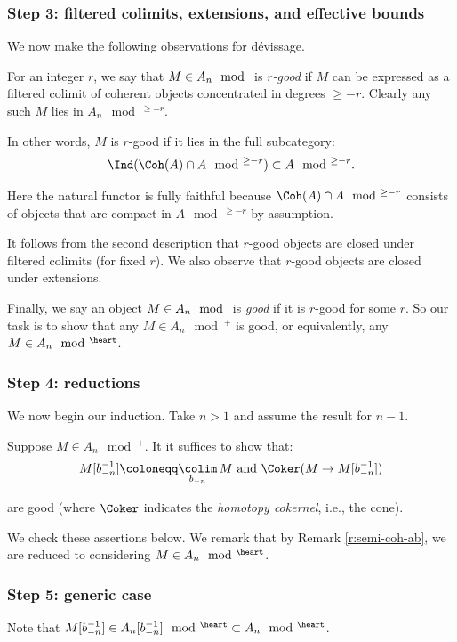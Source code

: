 \subsubsection{Step 3: filtered colimits, extensions, and effective bounds}
We now make the following observations for d\'evissage.

For an integer $r$, we say that $M \in A_n\mod$ is \emph{$r$-good} if $M$ can be
expressed as a filtered colimit of coherent objects concentrated in
degrees $\geq -r$. Clearly any such $M$ lies in $A_n\mod^{\geq -r}$.

In other words, $M$ is $r$-good if it lies in the full subcategory:
%
\[
\Ind(\Coh(A) \cap A\mod^{\geq -r}) \subset A\mod^{\geq -r}.
\]

 Here the natural functor is fully faithful because
$\Coh(A) \cap A\mod^{\geq -r}$ consists of objects that are
compact in $A\mod^{\geq -r}$ by assumption.

It follows from the second description that $r$-good objects are closed
under filtered colimits (for fixed $r$). We also observe that $r$-good objects
are closed under extensions.

Finally, we say an object $M \in A_n\mod$ is \emph{good} if it is
$r$-good for some $r$. So our task is to show that any $M \in A_n\mod^+$
is good, or equivalently, any $M \in A_n\mod^{\heart}$.

\subsubsection{Step 4: reductions}

We now begin our induction. Take $n>1$ and assume the result for $n-1$.

Suppose $M \in A_n\mod^+$.
It it suffices to show that:
%
\[
M[b_{-n}^{-1}] \coloneqq \underset{b_{-n}}{\colim} \, M \text{ and }
\Coker(M \to M[b_{-n}^{-1}])
\]

 are good (where $\Coker$ indicates the \emph{homotopy cokernel},
i.e., the cone).

We check these assertions below. We remark that by Remark \ref{r:semi-coh-ab},
we are reduced to considering $M \in A_n\mod^{\heart}$.

\subsubsection{Step 5: generic case}

Note that $M[b_{-n}^{-1}] \in A_n[b_{-n}^{-1}]\mod^{\heart} \subset A_n\mod^{\heart}$.

